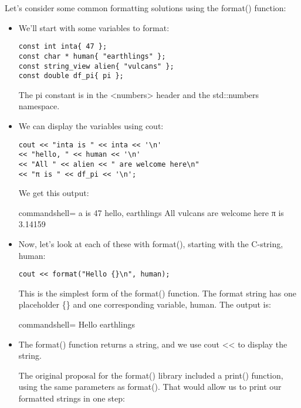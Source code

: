 Let's consider some common formatting solutions using the format() function:

\begin{itemize}
\item 
We'll start with some variables to format:

\begin{lstlisting}[style=styleCXX]
const int inta{ 47 };
const char * human{ "earthlings" };
const string_view alien{ "vulcans" };
const double df_pi{ pi };
\end{lstlisting}

The pi constant is in the <numbers> header and the std::numbers namespace.

\item 
We can display the variables using cout:

\begin{lstlisting}[style=styleCXX]
cout << "inta is " << inta << '\n'
<< "hello, " << human << '\n'
<< "All " << alien << " are welcome here\n"
<< "π is " << df_pi << '\n';
\end{lstlisting}

We get this output:

\begin{tcblisting}{commandshell={}}
a is 47
hello, earthlings
All vulcans are welcome here
π is 3.14159
\end{tcblisting}

\item 
Now, let's look at each of these with format(), starting with the C-string, human:

\begin{lstlisting}[style=styleCXX]
cout << format("Hello {}\n", human);
\end{lstlisting}

This is the simplest form of the format() function. The format string has one placeholder \{\} and one corresponding variable, human. The output is:

\begin{tcblisting}{commandshell={}}
Hello earthlings
\end{tcblisting}

\item 
The format() function returns a string, and we use cout << to display the string.

The original proposal for the format() library included a print() function, using the same parameters as format(). That would allow us to print our formatted strings in one step:


\end{itemize}

